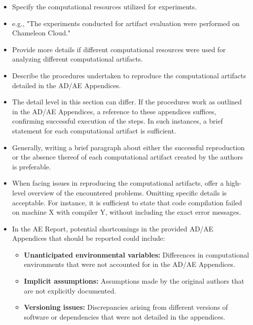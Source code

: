 \documentclass[sigconf]{acmart}
\begin{document}
\aerwhere

\begin{aerhint}
\begin{itemize}
    \item Specify the computational resources utilized for experiments.
    \item e.g., "The experiments conducted for artifact evaluation were performed on Chameleon Cloud."
    \item Provide more details if different computational resources were used for analyzing different computational artifacts.
\end{itemize}
\end{aerhint}

\aerwhat


\begin{aerhint}
\begin{itemize}
    \item Describe the procedures undertaken to reproduce the computational artifacts detailed in the AD/AE Appendices.
    \item The detail level in this section can differ. If the procedures work as outlined in the AD/AE Appendices, a reference to these appendices suffices, confirming successful execution of the steps.
    In such instances, a brief statement for each computational artifact is sufficient.
    \item Generally, writing a brief paragraph about either the successful reproduction or the absence thereof of each computational artifact created by the authors is preferable.
    \item When facing issues in reproducing the computational artifacts, offer a high-level overview of the encountered problems. Omitting specific details is acceptable. For instance, it is sufficient to state that code compilation failed on machine X with compiler Y, without including the exact error messages.
    \item In the AE Report, potential shortcomings in the provided AD/AE Appendices that should be reported could include:
    \begin{itemize}
        \item \textbf{Unanticipated environmental variables:} Differences in computational environments that were not accounted for in the AD/AE Appendices.
        \item \textbf{Implicit assumptions:} Assumptions made by the original authors that are not explicitly documented.
        \item \textbf{Versioning issues:} Discrepancies arising from different versions of software or dependencies that were not detailed in the appendices.

\end{itemize}
\end{itemize}
\end{aerhint}
\end{document}
